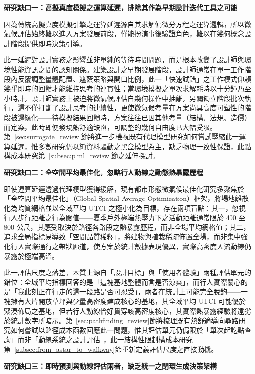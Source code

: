 \noindent\textbf{研究缺口一：高擬真度模擬之運算延遲，排除其作為早期設計迭代工具之可能}

因為傳統高擬真度模擬引擎之運算延遲源自其求解偏微分方程之運算邏輯，所以微氣候評估始終難以進入方案發展前段，僅能扮演事後驗證角色，難以在幾何概念設計階段提供即時決策引導。

此一延遲對設計實務之影響並非單純的等待時間問題，而是根本改變了設計師與環境性能資訊之間的認知關係。建築設計之早期發展階段，設計師通常在單一工作階段內反覆調整量體配置、遮蔭策略與開口比例，此一「快速試錯」之工作模式仰賴幾乎即時的回饋才能維持思考的連貫性；當環境模擬之單次求解耗時以十分鐘乃至小時計，設計師實務上被迫將微氣候評估自幾何操作中抽離，另闢獨立階段批次執行，這不僅打斷了設計思考的連續性，更使微氣候考量在方案尚具高度可塑性的階段被邊緣化——待模擬結果回饋時，方案往往已因其他考量（結構、法規、造價）而定案，此時即便發現熱舒適缺陷，可調整的幾何自由度已大幅受限。第~\ref{sec:surrogate_review}節將進一步檢視既有代理模型研究如何嘗試壓縮此一運算延遲，惟多數研究仍以純資料驅動之黑盒模型為主，缺乏物理一致性保證，此點構成本研究第~\ref{subsec:piml_review}節之延伸探討。

\noindent\textbf{研究缺口二：全空間平均最佳化，忽略行人動線之動態熱暴露歷程}

即使運算延遲透過代理模型獲得緩解，現有都市形態微氣候最佳化研究多聚焦於「全空間平均最佳化」（Global Spatial Average Optimization）框架，將場地離散化為均質網格並以全域平均 UTCI 之極小化為目標，存在兩項盲點：其一，忽視行人步行距離之行為閾值——夏季戶外極端熱壓力下之活動距離通常限於 400 至 800 公尺，其感受取決於路徑各路段之熱暴露歷程，而非全場平均網格值；其二，追求全局指標易導致「空間品質稀釋」，將建物與植栽稀疏佈置全場，而非集中強化行人實際通行之帶狀廊道，使方案於統計數據表現優異，實際高密度人流動線仍暴露於極端高溫。

此一評估尺度之落差，本質上源自「設計目標」與「使用者體驗」兩種評估單元的錯位：全域平均指標回答的是「這塊基地整體而言是否涼爽」，而行人實際關心的是「我此刻正在行走的這一段路是否可忍受」，兩者在統計上可能完全脫鉤——一塊擁有大片開放草坪與少量高密度建成核心的基地，其全域平均 UTCI 可能優於緊湊佈局之基地，但若行人動線恰好貫穿該高密度核心，其實際熱暴露經驗將遠劣於統計數字所暗示。第~\ref{sec:pathfinding_review}節將梳理既有熱舒適導向尋路研究如何嘗試以路徑成本函數回應此一問題，惟其評估單元仍侷限於「單次起訖點查詢」而非「動線系統之設計評估」，此一結構性限制構成本研究第~\ref{subsec:from_astar_to_walkway}節重新定義評估尺度之直接動機。

\noindent\textbf{研究缺口三：即時預測與動線評估兩者，缺乏統一之閉環生成決策架構}

